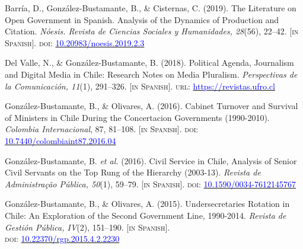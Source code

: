\begin{publications}
\begin{benumerate}{9}
\item{\small Barría, D., González-Bustamante, B., \& Cisternas, C. (2019). The Literature on Open Government in Spanish. Analysis of the Dynamics of Production and Citation. {\itshape N\'oesis. Revista de Ciencias Sociales y Humanidades, 28}(56), 22--42. {\footnotesize \scshape [in Spanish]}. {\scshape doi}: \href{http://dx.doi.org/10.20983/noesis.2019.2.3}{\textcolor{blue}{10.20983/noesis.2019.2.3}}}\vspace{1mm}

\item{\small Del Valle, N., \& González-Bustamante, B. (2018). Political Agenda, Journalism and Digital Media in Chile: Research Notes on Media Pluralism. {\itshape Perspectivas de la Comunicaci\'on, 11}(1), 291--326. {\footnotesize \scshape [in Spanish]}. {\scshape url}: \href{https://revistas.ufro.cl/ojs/index.php/perspectivas/article/view/1146}{\textcolor{blue}{https://revistas.ufro.cl}}}\vspace{1mm}

\item{\small González-Bustamante, B., \& Olivares, A. (2016). Cabinet Turnover and Survival of Ministers in Chile During the Concertacion Governments (1990-2010). {\itshape Colombia Internacional}, 87, 81--108. {\footnotesize \scshape [in Spanish]}. {\scshape doi}: \href{https://doi.org/10.7440/colombiaint87.2016.04}{\textcolor{blue}{10.7440/colombiaint87.2016.04}}}\vspace{1mm}

\item{\small González-Bustamante, B. {\itshape et al.} (2016). Civil Service in Chile, Analysis of Senior Civil Servants on the Top Rung of the Hierarchy (2003-13). {\itshape Revista de Administra\c{c}\~ao P\'ublica, 50}(1), 59--79. {\footnotesize \scshape [in Spanish]}. {\scshape doi}: \href{http://dx.doi.org/10.1590/0034-7612145767}{\textcolor{blue}{10.1590/0034-7612145767}}} \vspace{1mm}

\item{\small González-Bustamante, B., \& Olivares, A. (2015). Undersecretaries Rotation in Chile: An Exploration of the Second Government Line, 1990-2014. {\itshape Revista de Gesti\'on P\'ublica, IV}(2), 151--190. {\footnotesize \scshape [in Spanish]}. \\ {\scshape doi}: \href{https://doi.org/10.22370/rgp.2015.4.2.2230}{\textcolor{blue}{10.22370/rgp.2015.4.2.2230}}} \vspace{1mm}

\end{benumerate}

\end{publications}

